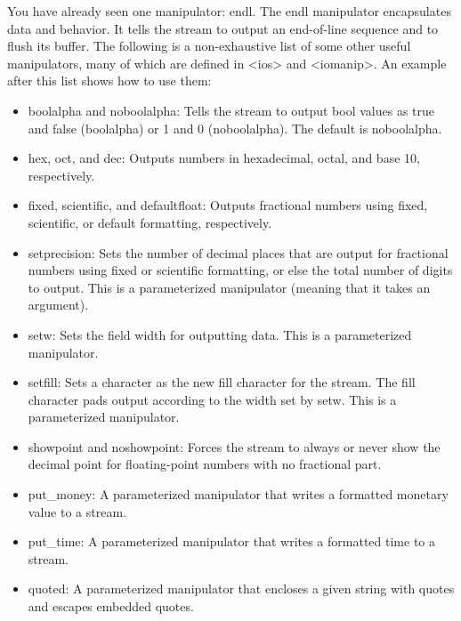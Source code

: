 You have already seen one manipulator: endl. The endl manipulator encapsulates data and behavior. It tells the stream to output an end-of-line sequence and to flush its buffer. The following is a non-exhaustive list of some other useful manipulators, many of which are defined in <ios> and <iomanip>. An example after this list shows how to use them:

\begin{itemize}
\item
boolalpha and noboolalpha: Tells the stream to output bool values as true and false (boolalpha) or 1 and 0 (noboolalpha). The default is noboolalpha.

\item
hex, oct, and dec: Outputs numbers in hexadecimal, octal, and base 10, respectively.

\item
fixed, scientific, and defaultfloat: Outputs fractional numbers using fixed, scientific, or default formatting, respectively.

\item
setprecision: Sets the number of decimal places that are output for fractional numbers using fixed or scientific formatting, or else the total number of digits to output. This is a parameterized manipulator (meaning that it takes an argument).

\item
setw: Sets the field width for outputting data. This is a parameterized manipulator.

\item
setfill: Sets a character as the new fill character for the stream. The fill character pads output according to the width set by setw. This is a parameterized manipulator.

\item
showpoint and noshowpoint: Forces the stream to always or never show the decimal point for floating-point numbers with no fractional part.

\item
put\_money: A parameterized manipulator that writes a formatted monetary value to a stream.

\item
put\_time: A parameterized manipulator that writes a formatted time to a stream.

\item
quoted: A parameterized manipulator that encloses a given string with quotes and escapes embedded quotes.
\end{itemize}

